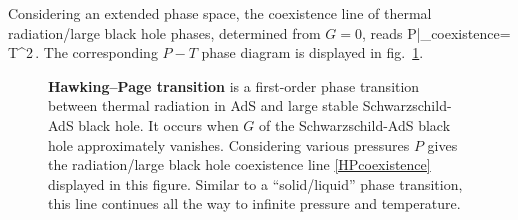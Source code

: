 Considering an extended phase space, the coexistence line of thermal radiation/large black hole phases, determined from $G=0$,
reads 
\be\label{HPcoexistence}
P|_{\mbox{\tiny  coexistence}}= T^2\,.
\ee
The corresponding $P-T$ phase diagram is displayed in fig.~\ref{Fig:HPtrans}.    
\begin{figure}
\begin{center}
\caption{{\bf Hawking--Page transition} is a first-order phase transition between thermal radiation in AdS and large stable Schwarzschild-AdS black hole. It occurs when $G$ of the Schwarzschild-AdS black hole approximately vanishes. Considering various pressures $P$ gives the radiation/large black hole coexistence line \eqref{HPcoexistence}  displayed in this figure. Similar to a ``solid/liquid'' phase transition, this line continues all the way to infinite pressure and temperature. 
}
\label{Fig:HPtrans}
\end{center}
\end{figure}



